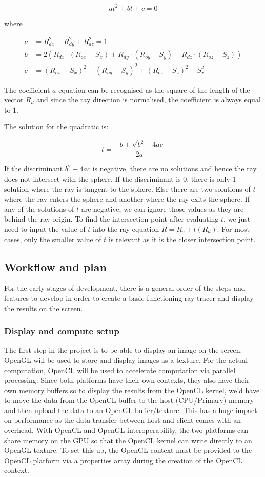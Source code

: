 \documentclass[final]{cmpreport}
\begin{document}
\[ at^2 + bt + c = 0 \]

where

\begin{align}
     a &= R_{dx}^2 + R_{dy}^2 + R_{dz}^2 = 1 \\
     b &= 2 (R_{dx} \cdot (R_{ox} - S_x) + R_{dy} \cdot (R_{oy} - S_y) + R_{dz} \cdot (R_{oz} - S_z)) \\
     c &= (R_{ox} - S_x)^2 + (R_{oy} - S_y)^2 + (R_{oz} - S_z)^2 - S_r^2 
\end{align}

The coefficient \(a\) equation can be recognised as the square of the length of the vector \(R_d\) and since the ray direction is normalised, the coefficient is always equal to \(1\).

The solution for the quadratic is:

\[t = \frac{-b \pm \sqrt{b^2 - 4ac}}{2a}\]

If the discriminant \(b^2 - 4ac\) is negative, there are no solutions and hence the ray does not intersect with the sphere. If the discriminant is 0, there is only 1 solution where the ray is tangent to the sphere. Else there are two solutions of \(t\) where the ray enters the sphere and another where the ray exits the sphere. If any of the solutions of \(t\) are negative, we can ignore those values as they are behind the ray origin. To find the intersection point after evaluating \(t\), we just need to input the value of \(t\) into the ray equation \(R = R_o + t(R_d)\). For most cases, only the smaller value of \(t\) is relevant as it is the closer intersection point.

\subsection{Workflow and plan}
For the early stages of development, there is a general order of the steps and features to develop in order to create a basic functioning ray tracer and display the results on the screen.

\subsubsection{Display and compute setup}
The first step in the project is to be able to display an image on the screen. OpenGL will be used to store and display images as a texture. For the actual computation, OpenCL will be used to accelerate computation via parallel processing. Since both platforms have their own contexts, they also have their own memory buffers so to display the results from the OpenCL kernel, we'd have to move the data from the OpenCL buffer to the host (CPU/Primary) memory and then upload the data to an OpenGL buffer/texture. This has a huge impact on performance as the data transfer between host and client comes with an overhead. With OpenCL and OpenGL interoperability, the two platforms can share memory on the GPU so that the OpenCL kernel can write directly to an OpenGL texture. To set this up, the OpenGL context must be provided to the OpenCL platform via a properties array during the creation of the OpenCL context.
\end{document}
